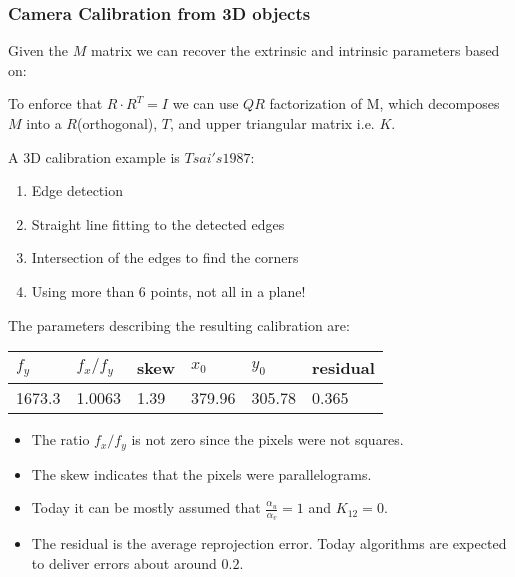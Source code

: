 \documentclass[10pt,a4paper]{scrartcl}
\begin{document}
\begin{multicols*}{2}
\subsubsection{Camera Calibration from 3D objects}

Given the $M$ matrix we can recover the extrinsic and intrinsic parameters based on:


To enforce that $R\cdot R^T=I$ we can use $QR$ factorization of M, which decomposes $M$ into a $R$(orthogonal), $T$, and upper triangular matrix i.e. $K$.

A 3D calibration example is $Tsai's 1987$:

\begin{enumerate}
\item Edge detection
\item Straight line fitting to the detected edges
\item Intersection of the edges to find the corners
\item Using more than 6 points, not all in a plane!
\end{enumerate}

The parameters describing the resulting calibration are:

\begin{center}
\begin{tabular}{|l|l|l|l|l|l|}
$f_y$&$f_x/f_y$&skew&$x_0$&$y_0$&residual\\
\hline\hline
1673.3&1.0063&1.39&379.96&305.78&0.365
\end{tabular}
\end{center}

\begin{itemize}
\item The ratio $f_x/f_y$ is not zero since the pixels were not squares.
\item The skew indicates that the pixels were parallelograms.
\item Today it can be mostly assumed that $\frac{\alpha_u}{\alpha_v}=1$ and $K_{12}=0$.
\item The residual is the average reprojection error. Today algorithms are expected to deliver errors about around $0.2$.
\end{itemize}


\end{multicols*}
\end{document}
